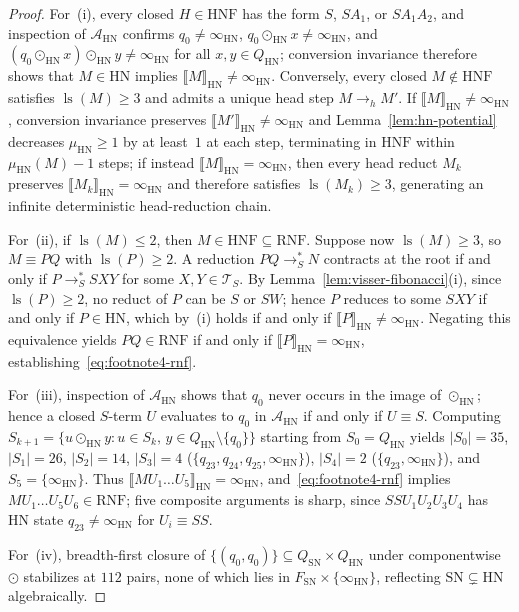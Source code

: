 \documentclass[11pt,reqno]{amsart}
\numberwithin{equation}{section}
\theoremstyle{plain}
\theoremstyle{definition}
\theoremstyle{remark}
\DeclareMathOperator{\ls}{ls}
\newcommand{\TS}{\mathcal{T}_S}
\newcommand{\HNF}{\mathrm{HNF}}
\newcommand{\RNF}{\mathrm{RNF}}
\newcommand{\SN}{\mathrm{SN}}
\newcommand{\HN}{\mathrm{HN}}
\newcommand{\sem}[1]{\llbracket #1 \rrbracket}
\newcommand{\redSs}{\to_S^*}
\begin{document}
\begin{proof}
For~(i), every closed $H \in \HNF$ has the form $S$, $S A_1$, or $S A_1 A_2$, and inspection of $\mathcal{A}_{\HN}$ confirms $q_0 \neq \infty_{\HN}$, $q_0 \odot_{\HN} x \neq \infty_{\HN}$, and $(q_0 \odot_{\HN} x) \odot_{\HN} y \neq \infty_{\HN}$ for all $x, y \in Q_{\HN}$; conversion invariance therefore shows that $M \in \HN$ implies $\sem{M}_{\HN} \neq \infty_{\HN}$. Conversely, every closed $M \notin \HNF$ satisfies $\ls(M) \ge 3$ and admits a unique head step $M \to_h M'$. If $\sem{M}_{\HN} \neq \infty_{\HN}$, conversion invariance preserves $\sem{M'}_{\HN} \neq \infty_{\HN}$ and Lemma~\ref{lem:hn-potential} decreases $\mu_{\HN} \ge 1$ by at least~$1$ at each step, terminating in $\HNF$ within $\mu_{\HN}(M) - 1$ steps; if instead $\sem{M}_{\HN} = \infty_{\HN}$, then every head reduct $M_k$ preserves $\sem{M_k}_{\HN} = \infty_{\HN}$ and therefore satisfies $\ls(M_k) \ge 3$, generating an infinite deterministic head-reduction chain.

For~(ii), if $\ls(M) \le 2$, then $M \in \HNF \subseteq \RNF$. Suppose now $\ls(M) \ge 3$, so $M \equiv P Q$ with $\ls(P) \ge 2$. A reduction $P Q \redSs N$ contracts at the root if and only if $P \redSs S X Y$ for some $X, Y \in \TS$. By Lemma~\ref{lem:visser-fibonacci}(i), since $\ls(P) \ge 2$, no reduct of $P$ can be $S$ or $S W$; hence $P$ reduces to some $S X Y$ if and only if $P \in \HN$, which by~(i) holds if and only if $\sem{P}_{\HN} \neq \infty_{\HN}$. Negating this equivalence yields $P Q \in \RNF$ if and only if $\sem{P}_{\HN} = \infty_{\HN}$, establishing~\eqref{eq:footnote4-rnf}.

For~(iii), inspection of $\mathcal{A}_{\HN}$ shows that $q_0$ never occurs in the image of $\odot_{\HN}$; hence a closed $S$-term $U$ evaluates to $q_0$ in $\mathcal{A}_{\HN}$ if and only if $U \equiv S$. Computing $S_{k+1} = \{ u \odot_{\HN} y : u \in S_k,\, y \in Q_{\HN} \setminus \{q_0\} \}$ starting from $S_0 = Q_{\HN}$ yields $|S_0| = 35$, $|S_1| = 26$, $|S_2| = 14$, $|S_3| = 4$ ($\{q_{23}, q_{24}, q_{25}, \infty_{\HN}\}$), $|S_4| = 2$ ($\{q_{23}, \infty_{\HN}\}$), and $S_5 = \{\infty_{\HN}\}$. Thus $\sem{M U_1 \dots U_5}_{\HN} = \infty_{\HN}$, and~\eqref{eq:footnote4-rnf} implies $M U_1 \dots U_5 U_6 \in \RNF$; five composite arguments is sharp, since $S S U_1 U_2 U_3 U_4$ has $\HN$ state $q_{23} \neq \infty_{\HN}$ for $U_i \equiv S S$.

For~(iv), breadth-first closure of $\{(q_0, q_0)\} \subseteq Q_{\SN} \times Q_{\HN}$ under componentwise $\odot$ stabilizes at $112$ pairs, none of which lies in $F_{\SN} \times \{\infty_{\HN}\}$, reflecting $\SN \subsetneq \HN$ algebraically.
\end{proof}
\end{document}
